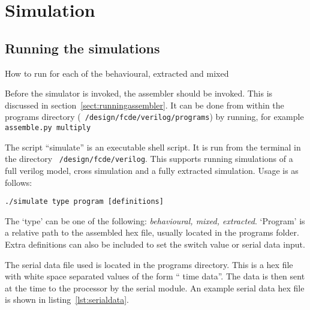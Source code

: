 
\section{Simulation}

\subsection{Running the simulations}



How to run for each of the behavioural, extracted and mixed

Before the simulator is invoked, the assembler should be invoked. 
This is discussed in section~\ref{sect:runningassembler}. 
It can be done from within the programs directory (\texttt{~/design/fcde/verilog/programs}) by running, for example \texttt{assemble.py multiply}

The script ``simulate'' is an executable shell script. 
It is run from the terminal in the directory \texttt{~/design/fcde/verilog}. 
This supports running simulations of a full verilog model, cross simulation and a fully extracted simulation. 
Usage is as follows:\\
\begin{center}
\texttt{./simulate type program [definitions]}
\end{center}

The `type' can be one of the following: \textit{behavioural, mixed, extracted}.
`Program' is a relative path to the assembled hex file, usually located in the programs folder. 
Extra definitions can also be included to set the switch value or serial data input.

The serial data file used is located in the programs directory. 
This is a hex file with white space separated values of the form `` time data''. 
The data is then sent at the time to the processor by the serial module. 
An example serial data hex file is shown in listing~\ref{lst:serialdata}.



